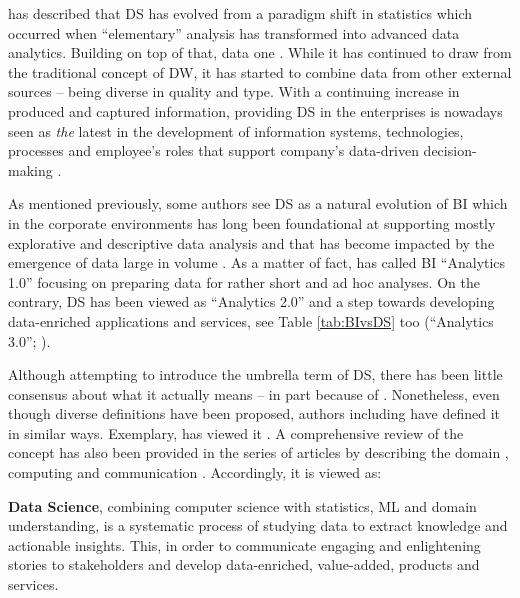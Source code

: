 \textcites{LongCao2016}{CaoLong2017} has described that \ac{DS} has evolved from a paradigm shift in statistics which occurred when \enquote{elementary} analysis has transformed into advanced data analytics.
Building on top of that, data  one \parencites[708]{Larson2016AScience}{Provost201351}.
While it has continued to draw from the traditional concept of \ac{DW}, it has started to combine data from other external sources -- being diverse in quality and type.
With a continuing increase in produced and captured information, providing \ac{DS} in the enterprises is nowadays seen as \emph{the} latest in the development of information systems, technologies, processes and employee's roles that support company's data-driven decision-making \parencites{DavidRostcheck2016DataDifference}{JelaniHarper2014DistinguishingScience}.

As mentioned previously, some authors see \ac{DS} as a natural evolution of \ac{BI} which in the corporate environments has long been foundational at supporting mostly explorative and descriptive data analysis and that has become impacted by the emergence of data large in volume \parencites{JBL:JBL12010}{Larson2016AScience}.
As a matter of fact, \textcite{Davenport2013Analytics3.0} has called \ac{BI} \enquote{Analytics 1.0} focusing on preparing data for rather short and ad hoc analyses. 
On the contrary, \ac{DS} has been viewed as \enquote{Analytics 2.0} and a step towards developing data-enriched applications and services, see Table \ref{tab:BIvsDS} too (\enquote{Analytics 3.0}; \cite{Larson2016AScience, CaoLong2017}). 

Although attempting to introduce the umbrella term of \ac{DS}, there has been little consensus about what it actually means -- in part because of  \parencites[6]{Carbone2016ChallengesPerspective}{CathyONeil2013DoingScience}{CarlShan2015TheScientists}.
Nonetheless, even though diverse definitions have been proposed, authors including \textcites{CharlesRoe2013ThePioneers}{FrancescoCorea2016DataMyths} have defined it in similar ways. 
Exemplary, \textcite[2151]{Dichev2017TowardsLiteracy} has viewed it .
A comprehensive review of the concept has also been provided in the series of articles by \textcites[8]{CaoLong2017}{LongCao2016} describing the domain , computing and communication . 
Accordingly, it is viewed as:
%
\begin{displayquote}
\textbf{Data Science}, combining computer science with statistics, \ac{ML} and domain understanding, is a systematic process of studying data to extract knowledge and actionable insights. 
This, in order to communicate engaging and enlightening stories to stakeholders and develop data-enriched, value-added, products and services.
\end{displayquote}

